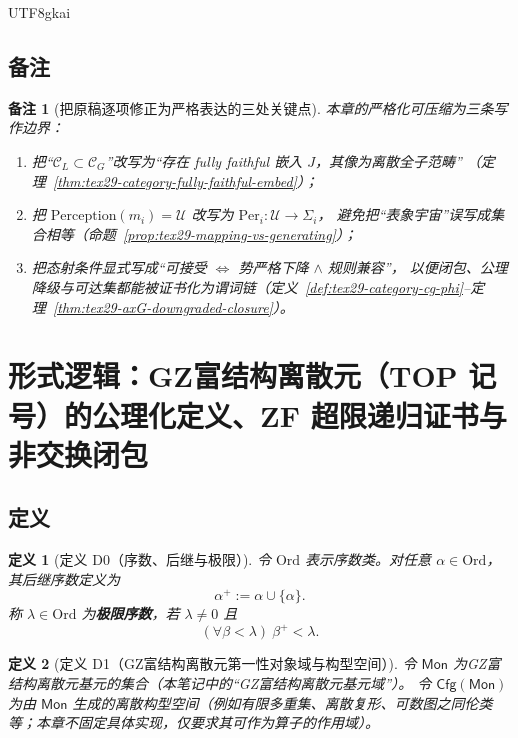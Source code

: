 \documentclass[12pt]{article}
\newtheorem{definition}{定义}[section]
\newtheorem{remark}{备注}[section]
\newcommand{\GZMonFull}{\texorpdfstring{GZ富结构离散元}{GZ富结构离散元}}
\newcommand{\GZMon}{\texorpdfstring{GZ富结构离散元}{GZ富结构离散元}}
\begin{document}
\begin{CJK*}{UTF8}{gkai}
\subsection{备注}
\label{subsec:tex29-causal-category-contrast-remark}

\begin{remark}[把原稿逐项修正为严格表达的三处关键点]
本章的严格化可压缩为三条写作边界：
\begin{enumerate}
  \item 把“$\mathcal{C}_L\subset\mathcal{C}_G$”改写为“存在 fully faithful 嵌入 $J$，其像为离散全子范畴”
  （定理~\ref{thm:tex29-category-fully-faithful-embed}）；
  \item 把 $\mathrm{Perception}(m_i)=\mathcal{U}$ 改写为 $\mathrm{Per}_i:\mathcal{U}\to\Sigma_i$，
  避免把“表象宇宙”误写成集合相等（命题~\ref{prop:tex29-mapping-vs-generating}）；
  \item 把态射条件显式写成“可接受 $\Leftrightarrow$ 势严格下降 $\wedge$ 规则兼容”，
  以便闭包、公理降级与可达集都能被证书化为谓词链（定义~\ref{def:tex29-category-cg-phi}--定理~\ref{thm:tex29-axG-downgraded-closure}）。
\end{enumerate}
\end{remark}

\clearpage

\section{形式逻辑：\GZMonFull{}（TOP 记号）的公理化定义、ZF 超限递归证书与非交换闭包}
\label{sec:tex29-top}
\label{sec:tex29-ch13}

\subsection{定义}
\label{subsec:tex29-top-defs}

\begin{definition}[定义 D0（序数、后继与极限）]
\label{def:tex29-top-ordinal}
令 $\mathrm{Ord}$ 表示序数类。对任意 $\alpha\in\mathrm{Ord}$，其后继序数定义为
\[
  \alpha^{+}:=\alpha\cup\{\alpha\}.
\]
称 $\lambda\in\mathrm{Ord}$ 为\textbf{极限序数}，若 $\lambda\neq 0$ 且
\[
  (\forall \beta<\lambda)\ \beta^{+}<\lambda.
\]
\end{definition}

\begin{definition}[定义 D1（\GZMonFull{}第一性对象域与构型空间）]
\label{def:tex29-top-mon-cfg}
令 $\mathsf{Mon}$ 为\GZMon{}基元的集合（本笔记中的“\GZMon{}基元域”）。
令 $\mathsf{Cfg}(\mathsf{Mon})$ 为由 $\mathsf{Mon}$ 生成的离散构型空间（例如有限多重集、离散复形、可数图之同伦类等；本章不固定具体实现，仅要求其可作为算子的作用域）。
\end{definition}


\end{CJK*}
\end{document}

